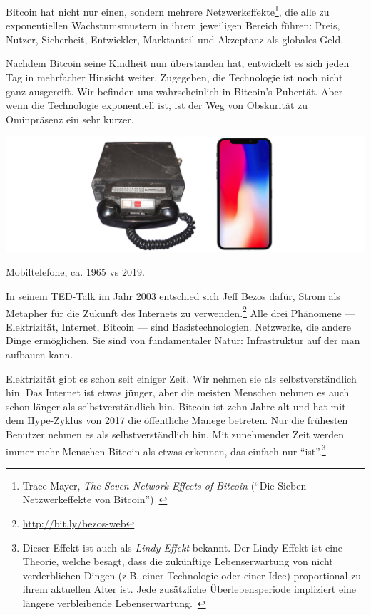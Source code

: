 Bitcoin hat nicht nur einen, sondern mehrere Netzwerkeffekte\footnote{Trace
Mayer, \textit{The Seven Network Effects of Bitcoin} (\enquote{Die Sieben
Netzwerkeffekte von Bitcoin})~\cite{7-network-effects}}, die alle zu
exponentiellen Wachstumsmustern in ihrem jeweiligen Bereich führen: Preis,
Nutzer, Sicherheit, Entwickler, Marktanteil und Akzeptanz als globales Geld.

Nachdem Bitcoin seine Kindheit nun überstanden hat, entwickelt es sich jeden Tag
in mehrfacher Hinsicht weiter. Zugegeben, die Technologie ist noch nicht ganz
ausgereift. Wir befinden uns wahrscheinlich in Bitcoin's Pubertät. Aber wenn die
Technologie exponentiell ist, ist der Weg von Obskurität zu Ominpräsenz ein sehr
kurzer.

\begin{center}
  \includegraphics[width=\textwidth]{assets/images/mobile-phone.png}
  \caption{Mobiltelefone, ca. 1965 vs 2019.}
  \label{fig:mobile-phone}
\end{center}

In seinem TED-Talk im Jahr 2003 entschied sich Jeff Bezos dafür, Strom als
Metapher für die Zukunft des Internets zu
verwenden.\footnote{\url{http://bit.ly/bezos-web}} Alle drei Phänomene ---
Elektrizität, Internet, Bitcoin --- sind Basistechnologien. Netzwerke, die
andere Dinge ermöglichen. Sie sind von fundamentaler Natur: Infrastruktur auf
der man aufbauen kann.

Elektrizität gibt es schon seit einiger Zeit. Wir nehmen sie als
selbstverständlich hin. Das Internet ist etwas jünger, aber die meisten Menschen
nehmen es auch schon länger als selbstverständlich hin. Bitcoin ist zehn Jahre
alt und hat mit dem Hype-Zyklus von 2017 die öffentliche Manege betreten. Nur
die frühesten Benutzer nehmen es als selbstverständlich hin. Mit zunehmender
Zeit werden immer mehr Menschen Bitcoin als etwas erkennen, das einfach nur
\enquote{ist}.\footnote{Dieser Effekt ist auch als \textit{Lindy-Effekt}
bekannt. Der Lindy-Effekt ist eine Theorie, welche besagt, dass die zukünftige
Lebenserwartung von nicht verderblichen Dingen (z.B. einer Technologie oder einer
Idee) proportional zu ihrem aktuellen Alter ist. Jede zusätzliche
Überlebensperiode impliziert eine längere verbleibende
Lebenserwartung.~\cite{wiki:lindy}}

